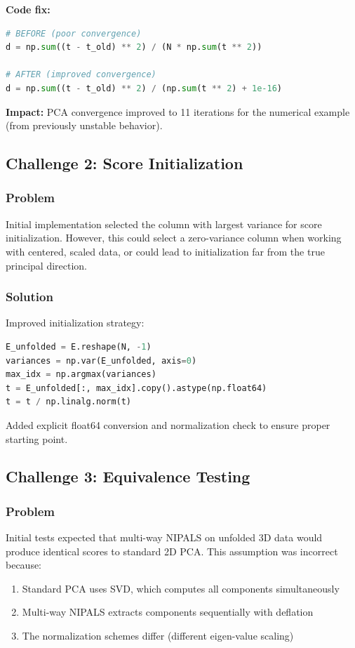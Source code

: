 \documentclass[12pt,a4paper]{article}
\begin{document}
\textbf{Code fix:}
\begin{lstlisting}[language=Python]
# BEFORE (poor convergence)
d = np.sum((t - t_old) ** 2) / (N * np.sum(t ** 2))

# AFTER (improved convergence)
d = np.sum((t - t_old) ** 2) / (np.sum(t ** 2) + 1e-16)
\end{lstlisting}

\textbf{Impact:} PCA convergence improved to 11 iterations for the numerical example (from previously unstable behavior).

\subsection{Challenge 2: Score Initialization}

\subsubsection{Problem}
Initial implementation selected the column with largest variance for score initialization. However, this could select a zero-variance column when working with centered, scaled data, or could lead to initialization far from the true principal direction.

\subsubsection{Solution}
Improved initialization strategy:
\begin{lstlisting}[language=Python]
E_unfolded = E.reshape(N, -1)
variances = np.var(E_unfolded, axis=0)
max_idx = np.argmax(variances)
t = E_unfolded[:, max_idx].copy().astype(np.float64)
t = t / np.linalg.norm(t)
\end{lstlisting}

Added explicit float64 conversion and normalization check to ensure proper starting point.

\subsection{Challenge 3: Equivalence Testing}

\subsubsection{Problem}
Initial tests expected that multi-way NIPALS on unfolded 3D data would produce identical scores to standard 2D PCA. This assumption was incorrect because:
\begin{enumerate}
    \item Standard PCA uses SVD, which computes all components simultaneously
    \item Multi-way NIPALS extracts components sequentially with deflation
    \item The normalization schemes differ (different eigen-value scaling)
\end{enumerate}
\end{document}
